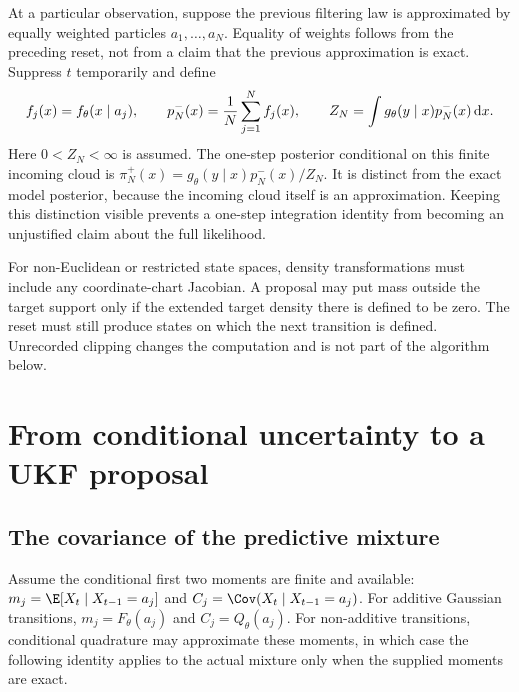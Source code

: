At a particular observation, suppose the previous filtering law is
approximated by equally weighted particles \(a_1,\ldots,a_N\). Equality of
weights follows from the preceding reset, not from a claim that the previous
approximation is exact. Suppress \(t\) temporarily and define
\begin{equation}
\label{eq:bf-covariance-proposal-finite-target}
 f_j(x)=f_\theta(x\mid a_j),\qquad
 p_N^-(x)=\frac1N\sum_{j=1}^N f_j(x),\qquad
 Z_N=\int g_\theta(y\mid x)p_N^-(x)\,\mathrm d x .
\end{equation}
Here \(0<Z_N<\infty\) is assumed. The one-step posterior conditional on this
finite incoming cloud is
\(\pi_N^+(x)=g_\theta(y\mid x)p_N^-(x)/Z_N\).
It is distinct from the exact model posterior, because the incoming cloud
itself is an approximation. Keeping this distinction visible prevents a
one-step integration identity from becoming an unjustified claim about the
full likelihood.

For non-Euclidean or restricted state spaces, density transformations must
include any coordinate-chart Jacobian. A proposal may put mass outside the
target support only if the extended target density there is defined to be
zero. The reset must still produce states on which the next transition is
defined. Unrecorded clipping changes the computation and is not part of the
algorithm below.

\section{From conditional uncertainty to a UKF proposal}

\subsection{The covariance of the predictive mixture}

Assume the conditional first two moments are finite and available:
\(m_j=\E[X_t\mid X_{t-1}=a_j]\) and
\(C_j=\Cov(X_t\mid X_{t-1}=a_j)\).
For additive Gaussian transitions, \(m_j=F_\theta(a_j)\) and
\(C_j=Q_\theta(a_j)\). For non-additive transitions, conditional quadrature
may approximate these moments, in which case the following identity applies
to the actual mixture only when the supplied moments are exact.

